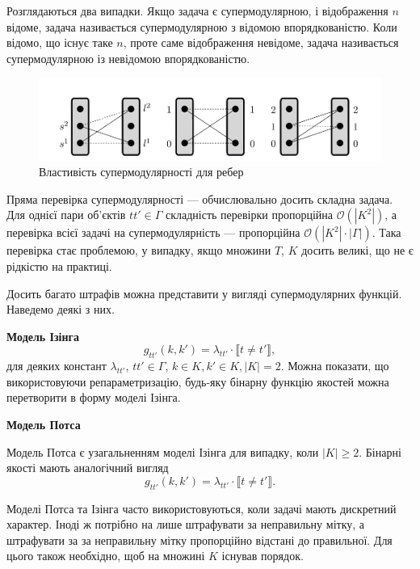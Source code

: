 Розглядаються два випадки. Якщо задача є супермодулярною, і відображення $n$ відоме, 
задача називається супермодулярною з відомою впорядкованістю. Коли відомо, що існує таке
$n$, проте саме відображення невідоме, задача називається супермодулярною із 
невідомою впорядкованістю.
\begin{figure}[h]
  \centering
  \includegraphics[width=1\textwidth]{images/submodularity_ilustr.jpg}
  \caption{Властивість супермодулярності для ребер}
  \label{fig:submodularity_example}
\end{figure}
Пряма перевірка супермодулярності --- обчислювально досить складна задача. Для 
однієї пари об'єктів $tt'\in \Gamma$ складність перевірки пропорційна
$\mathcal{O}(|K^2|)$, а перевірка всієї задачі на супермодулярність --- пропорційна
$\mathcal{O}(|K^2|\cdot |\Gamma|)$. Така перевірка стає проблемою, у випадку, якщо
множини $T$, $K$ досить великі, що не є рідкістю на практиці.

Досить багато штрафів можна представити у вигляді супермодулярних 
функцій. Наведемо деякі з них.

\textbf{Модель Ізінга}
\begin{equation}
  g_{tt'}(k,k') = \lambda_{tt'}\cdot \llbracket t \neq t' \rrbracket,
 \end{equation}
для деяких констант $\lambda_{tt'}$, $tt'\in\Gamma$, $k\in K,k'\in K, \left\lvert K\right\rvert = 2 $.
Можна показати, що використовуючи репараметризацію, 
будь-яку бінарну функцію якостей можна перетворити в форму моделі Ізінга.

\textbf{Модель Потса}

Модель Потса є узагальненням моделі Ізінга для випадку, коли $|K|\geq 2$.
Бінарні якості мають аналогічний вигляд
\begin{equation}
  g_{tt'}(k,k') = \lambda_{tt'}\cdot \llbracket t \neq t' \rrbracket.
 \end{equation}

Моделі Потса та Ізінга часто використовуються, коли задачі мають дискретний
характер. Іноді ж потрібно на лише штрафувати за неправильну мітку, а штрафувати
за за неправильну мітку пропорційно відстані до правильної. Для цього також 
необхідно, щоб на множині $K$ існував порядок.

